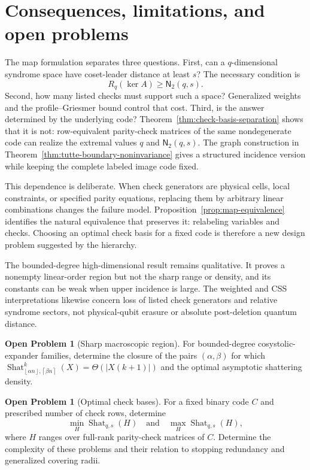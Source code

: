 \documentclass[11pt,letterpaper]{article}
\theoremstyle{plain}
\theoremstyle{definition}
\newtheorem{openproblem}[theorem]{Open Problem}
\newcommand{\Shat}{\operatorname{Shat}}
\newcommand{\1}{\mathbf{1}}
\newcommand{\ceil}[1]{\left\lceil#1\right\rceil}
\newcommand{\floor}[1]{\left\lfloor#1\right\rfloor}
\begin{document}
\section{Consequences, limitations, and open problems}\label{sec:discussion}

The map formulation separates three questions.  First, can a $q$-dimensional
syndrome space have coset-leader distance at least $s$?  The necessary
condition is
\[
 R_q(\ker A)\ge\mathsf N_2(q,s).
\]
Second, how many listed checks must support such a space?  Generalized weights
and the profile--Griesmer bound control that cost.  Third, is the answer
determined by the underlying code?  Theorem~\ref{thm:check-basis-separation}
shows that it is not: row-equivalent parity-check matrices of the same
nondegenerate code can realize the extremal values $q$ and
$\mathsf N_2(q,s)$.  The graph construction in
Theorem~\ref{thm:tutte-boundary-noninvariance} gives a structured incidence
version while keeping the complete labeled image code fixed.

This dependence is deliberate.  When check generators are physical cells,
local constraints, or specified parity equations, replacing them by arbitrary
linear combinations changes the failure model.  Proposition~\ref{prop:map-equivalence}
identifies the natural equivalence that preserves it: relabeling variables and
checks.  Choosing an optimal check basis for a fixed code is therefore a new
design problem suggested by the hierarchy.

The bounded-degree high-dimensional result remains qualitative.  It proves a
nonempty linear-order region but not the sharp range or density, and its
constants can be weak when upper incidence is large.  The weighted and CSS
interpretations likewise concern loss of listed check generators and relative
syndrome sectors, not physical-qubit erasure or absolute post-deletion quantum
distance.

\begin{openproblem}[Sharp macroscopic region]
For bounded-degree cosystolic-expander families, determine the closure of the
pairs $(\alpha,\beta)$ for which
$\Shat_{\floor{\alpha n},\ceil{\beta n}}^k(X)=\Theta(|X(k+1)|)$ and the
optimal asymptotic shattering density.
\end{openproblem}

\begin{openproblem}[Optimal check bases]
For a fixed binary code $C$ and prescribed number of check rows, determine
\[
 \min_H\Shat_{q,s}(H)\quad\text{and}\quad\max_H\Shat_{q,s}(H),
\]
where $H$ ranges over full-rank parity-check matrices of $C$.  Determine the
complexity of these problems and their relation to stopping redundancy and
generalized covering radii.
\end{openproblem}
\end{document}
